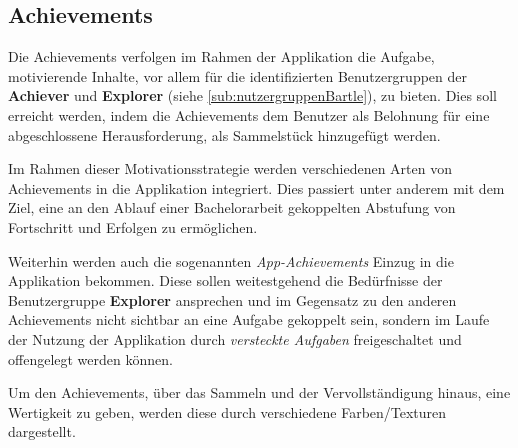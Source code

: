 \documentclass[bibliography=totoc,listof=totoc,BCOR=5mm,DIV=12,oneside]{scrbook}
\begin{document}
\subsection{Achievements} \label{sub:konzeptGamificationAchievements}
\par Die Achievements verfolgen im Rahmen der Applikation die Aufgabe, motivierende Inhalte, vor allem für die identifizierten Benutzergruppen der \textbf{Achiever} und \textbf{Explorer} (siehe \ref{sub:nutzergruppenBartle}), zu bieten. Dies soll erreicht werden, indem die Achievements dem Benutzer als Belohnung für eine abgeschlossene Herausforderung, als Sammelstück hinzugefügt werden.
\par \medskip Im Rahmen dieser Motivationsstrategie werden verschiedenen Arten von Achievements in die Applikation integriert. Dies passiert unter anderem mit dem Ziel, eine an den Ablauf einer Bachelorarbeit gekoppelten Abstufung von Fortschritt und Erfolgen zu ermöglichen. 
\par Weiterhin werden auch die sogenannten \textit{App-Achievements} Einzug in die Applikation bekommen. Diese sollen weitestgehend die Bedürfnisse der Benutzergruppe \textbf{Explorer} ansprechen und im Gegensatz zu den anderen Achievements nicht sichtbar an eine Aufgabe gekoppelt sein, sondern im Laufe der Nutzung der Applikation durch \textit{versteckte Aufgaben} freigeschaltet und offengelegt werden können.

\par \medskip Um den Achievements, über das Sammeln und der Vervollständigung hinaus, eine Wertigkeit zu geben, werden diese durch verschiedene Farben/Texturen dargestellt. 
\end{document}

